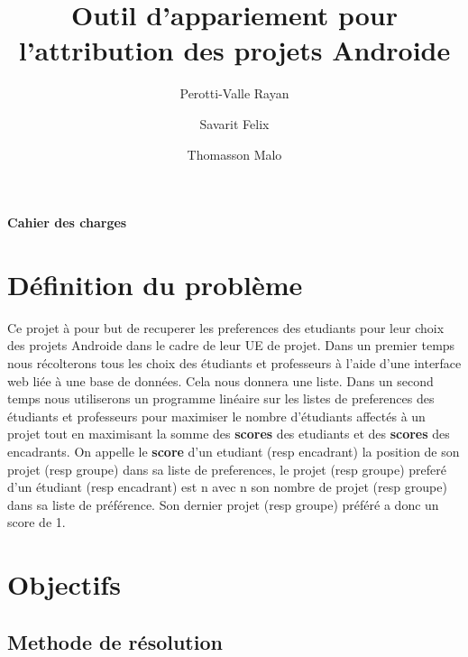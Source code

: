 \documentclass{article}
\title{\huge Outil d'appariement pour l'attribution des projets Androide}
\author{
  Perotti-Valle Rayan \\
  \and
  Savarit Felix \\
  \and
  Thomasson Malo
}
\date{}
\begin{document}
\maketitle

{\centering\bfseries\large Cahier des charges\par}

\vfill
{}


\newpage

\renewcommand{\contentsname}{Sommaire} %

\tableofcontents{} %

\newpage

\section{Définition du problème}
Ce projet à pour but de recuperer les preferences des etudiants pour leur choix des projets Androide dans le cadre de leur UE de projet.
Dans un premier temps nous récolterons tous les choix des étudiants et professeurs à l'aide d'une interface web liée à une base de données. Cela nous donnera une liste. 
Dans un second temps nous utiliserons un programme linéaire sur les listes de preferences des étudiants et professeurs pour maximiser le nombre d'étudiants affectés à un projet tout en maximisant la somme des \textbf{scores} des etudiants et des \textbf{scores} des encadrants. On appelle le \textbf{score} d'un etudiant (resp encadrant) la position de son projet (resp groupe) dans sa liste de preferences, le projet (resp groupe) preferé d'un étudiant (resp encadrant) est n avec n son nombre de projet (resp groupe) dans sa liste de préférence. Son dernier projet (resp groupe) préféré a donc un score de 1.

\section{Objectifs}


\subsection{Methode de résolution}
\end{document}

